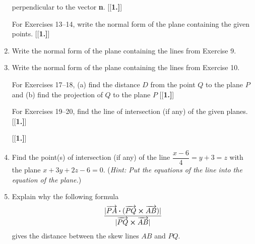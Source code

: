\begin{enumerate}[\bfseries 1.]
perpendicular to the vector \textbf{n}.
[{[\bfseries 1.]}]
\par\noindent For Exercises 13--14, write the normal form of the plane containing the given points.
[{[\bfseries 1.]}]
 \item Write the normal form of the plane containing the lines from Exercise 9.
 \item Write the normal form of the plane containing the lines from Exercise 10.
\par\noindent For Exercises 17--18, (a) find the distance $D$ from the point $Q$ to the plane $P$ and (b) find the projection of $Q$ to the plane $P$
[{[\bfseries 1.]}]
\par\noindent For Exercises 19--20, find the line of intersection (if any) of the given planes.
[{[\bfseries 1.]}]
[{[\bfseries 1.]}]
 \item Find the point(s) of intersection (if any) of the line $\dfrac{x - 6}{4} = y + 3 = z$ with the plane
 $x + 3y + 2z - 6 = 0$. (\emph{Hint: Put the equations of the line into the equation of the plane.})
\item Explain why the following formula 
\[\frac{|\overrightarrow{PA} \bm{\cdot} (\overrightarrow{PQ} \bm{\times} \overrightarrow{AB})|}{|{\overrightarrow{PQ} \bm{\times} \overrightarrow{AB}}|}\]
gives the distance between the skew lines $AB$ and $PQ$.
\end{enumerate}



